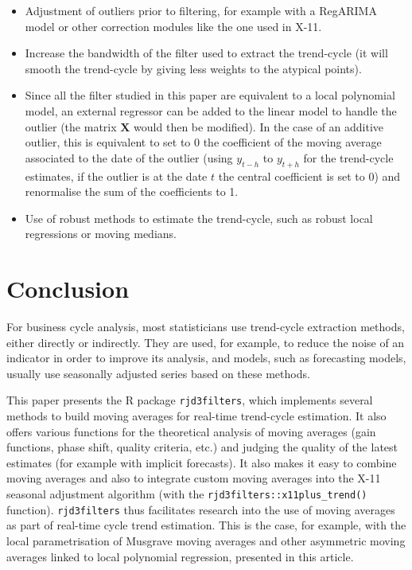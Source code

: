 \documentclass[
]{article}
\newcommand\1{\mathds{1}}
\begin{document}
\begin{itemize}
\item
  Adjustment of outliers prior to filtering, for example with a RegARIMA
  model or other correction modules like the one used in X-11.
\item
  Increase the bandwidth of the filter used to extract the trend-cycle
  (it will smooth the trend-cycle by giving less weights to the atypical
  points).
\item
  Since all the filter studied in this paper are equivalent to a local
  polynomial model, an external regressor can be added to the linear
  model to handle the outlier (the matrix \(\boldsymbol X\) would then
  be modified). In the case of an additive outlier, this is equivalent
  to set to 0 the coefficient of the moving average associated to the
  date of the outlier (using \(y_{t-h}\) to \(y_{t+h}\) for the
  trend-cycle estimates, if the outlier is at the date \(t\) the central
  coefficient is set to 0) and renormalise the sum of the coefficients
  to 1.
\item
  Use of robust methods to estimate the trend-cycle, such as robust
  local regressions or moving medians.
\end{itemize}

\section{Conclusion}\label{conclusion}

For business cycle analysis, most statisticians use trend-cycle
extraction methods, either directly or indirectly. They are used, for
example, to reduce the noise of an indicator in order to improve its
analysis, and models, such as forecasting models, usually use seasonally
adjusted series based on these methods.

This paper presents the R package \texttt{rjd3filters}, which implements
several methods to build moving averages for real-time trend-cycle
estimation. It also offers various functions for the theoretical
analysis of moving averages (gain functions, phase shift, quality
criteria, etc.) and judging the quality of the latest estimates (for
example with implicit forecasts). It also makes it easy to combine
moving averages and also to integrate custom moving averages into the
X-11 seasonal adjustment algorithm (with the
\texttt{rjd3filters::x11plus\_trend()} function). \texttt{rjd3filters}
thus facilitates research into the use of moving averages as part of
real-time cycle trend estimation. This is the case, for example, with
the local parametrisation of Musgrave moving averages and other
asymmetric moving averages linked to local polynomial regression,
presented in this article.
\end{document}
